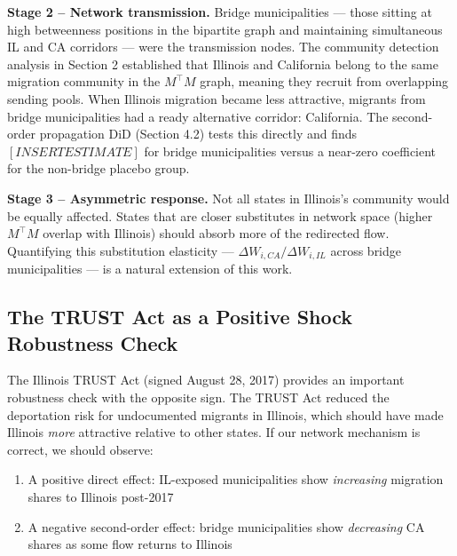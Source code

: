 \documentclass[
  11pt,
  letterpaper,
  DIV=11,
  numbers=noendperiod]{scrartcl}
\providecommand{\tightlist}{%
  \setlength{\itemsep}{0pt}\setlength{\parskip}{0pt}}
\begin{document}
\textbf{Stage 2 -- Network transmission.} Bridge municipalities ---
those sitting at high betweenness positions in the bipartite graph and
maintaining simultaneous IL and CA corridors --- were the transmission
nodes. The community detection analysis in Section 2 established that
Illinois and California belong to the same migration community in the
\(M^\top M\) graph, meaning they recruit from overlapping sending pools.
When Illinois migration became less attractive, migrants from bridge
municipalities had a ready alternative corridor: California. The
second-order propagation DiD (Section 4.2) tests this directly and finds
\([INSERT ESTIMATE]\) for bridge municipalities versus a near-zero
coefficient for the non-bridge placebo group.

\textbf{Stage 3 -- Asymmetric response.} Not all states in Illinois's
community would be equally affected. States that are closer substitutes
in network space (higher \(M^\top M\) overlap with Illinois) should
absorb more of the redirected flow. Quantifying this substitution
elasticity --- \(\Delta W_{i,CA} / \Delta W_{i,IL}\) across bridge
municipalities --- is a natural extension of this work.

\subsection{The TRUST Act as a Positive Shock Robustness
Check}\label{the-trust-act-as-a-positive-shock-robustness-check}

The Illinois TRUST Act (signed August 28, 2017) provides an important
robustness check with the opposite sign. The TRUST Act reduced the
deportation risk for undocumented migrants in Illinois, which should
have made Illinois \emph{more} attractive relative to other states. If
our network mechanism is correct, we should observe:

\begin{enumerate}
\def\labelenumi{\arabic{enumi}.}
\tightlist
\item
  A positive direct effect: IL-exposed municipalities show
  \emph{increasing} migration shares to Illinois post-2017
\item
  A negative second-order effect: bridge municipalities show
  \emph{decreasing} CA shares as some flow returns to Illinois
\end{enumerate}
\end{document}
